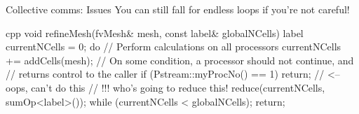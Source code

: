 
\begin{frame}[fragile]{Collective comms: Issues}
You can still fall for endless loops if you're not careful!
\begin{CodeEnvNoComment}{cpp}{\scriptsize}
void refineMesh(fvMesh& mesh, const label& globalNCells)
{
  label currentNCells = 0;
  do
  {
    // Perform calculations on all processors
    currentNCells += addCells(mesh);
    // On some condition, a processor should not continue, and
    // returns control to the caller
    if (Pstream::myProcNo() == 1) return; // <-- oops, can't do this
    // !!! who's going to reduce this!
    reduce(currentNCells, sumOp<label>());
  } while (currentNCells < globalNCells);
  return;
}
\end{CodeEnvNoComment}
\end{frame}

